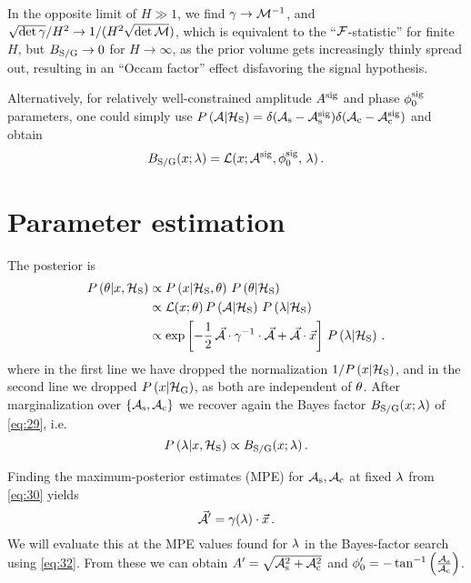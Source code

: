 \documentclass[aps,prd,onecolumn,notitlepage,nofootinbib,superscriptaddress,altaffilletter,floatfix]{revtex4-1}
\begin{document}
In the opposite limit of $H\gg 1$, we find $\gamma\rightarrow\mathcal{M}^{-1}$, and $\sqrt{\det\gamma}/H^2\rightarrow 1/(H^2\sqrt{\det\mathcal{M}})$, which is equivalent to
the ``$\mathcal{F}$-statistic'' for finite $H$, but $B_{\mathrm{S/G}}\rightarrow 0$ for $H\rightarrow \infty$, as the prior volume gets increasingly thinly spread out,
resulting in an ``Occam factor'' effect disfavoring the signal hypothesis.

Alternatively, for relatively well-constrained amplitude $A^{{\mathrm{sig}}}$ and phase $\phi_0^{\mathrm{sig}}$ parameters, one could simply use $P\left(\mathcal{A}|\mathcal{H}_{\mathrm{S}}\right) = \delta(\mathcal{A}_{\mathrm{s}}-\mathcal{A}_{\mathrm{s}}^{\mathrm{sig}})\delta(\mathcal{A}_{\mathrm{c}}-\mathcal{A}_{\mathrm{c}}^{\mathrm{sig}})$ and obtain
\begin{equation}
  \label{eq:24}
  B_{\mathrm{S/G}}(x;\lambda) = \mathcal{L}(x;\mathcal{A}^{\mathrm{sig}},\phi_0^{\mathrm{sig}},\,\lambda)\,.
\end{equation}

\section{Parameter estimation}
\label{sec:parameter-estimation}

The posterior is
\begin{align}
  \label{eq:30}
  P\left(\theta|x,\mathcal{H}_{\mathrm{S}}\right) &\propto P\left(x|\mathcal{H}_{\mathrm{S}},\theta\right)\,P\left(\theta|\mathcal{H}_{\mathrm{S}}\right)\\
    &\propto \mathcal{L}(x;\theta)\,P\left(\mathcal{A}|\mathcal{H}_{\mathrm{S}}\right)\,P\left(\lambda|\mathcal{H}_{\mathrm{S}}\right)\\
    &\propto \exp\left[-\frac{1}{2}\, \vec{\mathcal{A}}\cdot\gamma^{-1}\cdot\vec{\mathcal{A}} + \vec{\mathcal{A}}\cdot\vec{x}\right]\,P\left(\lambda|\mathcal{H}_{\mathrm{S}}\right)\,.
\end{align}
where in the first line we have dropped the normalization $1/P\left(x|\mathcal{H}_{\mathrm{S}}\right)$, and in the second line we dropped $P\left(x|\mathcal{H}_{\mathrm{G}}\right)$, as both are
independent of $\theta$.
After marginalization over $\{\mathcal{A}_{\mathrm{s}},\mathcal{A}_{\mathrm{c}}\}$ we recover again the Bayes factor $B_{\mathrm{S/G}}(x;\lambda)$ of \eqref{eq:29}, i.e.
\begin{equation}
  \label{eq:32}
  P\left(\lambda|x,\mathcal{H}_{\mathrm{S}}\right) \propto B_{\mathrm{S/G}}(x;\lambda)\,.
\end{equation}

Finding the maximum-posterior estimates (MPE) for $\mathcal{A}_{\mathrm{s}},\mathcal{A}_{\mathrm{c}}$ at fixed $\lambda$ from \eqref{eq:30} yields
\begin{equation}
  \label{eq:31}
  \vec{\mathcal{A}}' = \gamma(\lambda)\cdot\vec{x}\,.
\end{equation}
We will evaluate this at the MPE values found for $\lambda$ in the Bayes-factor search using \eqref{eq:32}.
From these we can obtain $A' = \sqrt{\mathcal{A}_{\mathrm{s}}^2+\mathcal{A}_{\mathrm{c}}^2}$ and $\phi_0' = - \tan^{-1}\left(\frac{\mathcal{A}_{\mathrm{s}}}{\mathcal{A}_{\mathrm{c}}}\right)$.
\end{document}
